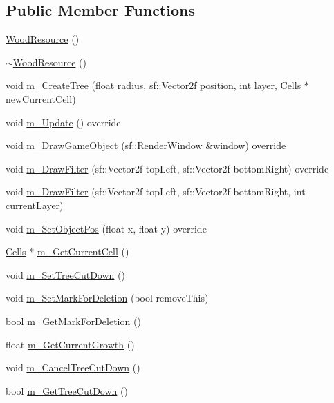 \subsection*{Public Member Functions}
\begin{DoxyCompactItemize}
\item 
\mbox{\hyperlink{class_wood_resource_a692782e93b0450b26694eb3d48c86a2a}{Wood\+Resource}} ()
\item 
\mbox{\hyperlink{class_wood_resource_ad525b51c0f4728951969b90498760a63}{$\sim$\+Wood\+Resource}} ()
\item 
void \mbox{\hyperlink{class_wood_resource_aeea45c6a211c4662ff114cd77f604c68}{m\+\_\+\+Create\+Tree}} (float radius, sf\+::\+Vector2f position, int layer, \mbox{\hyperlink{class_cells}{Cells}} $\ast$new\+Current\+Cell)
\item 
void \mbox{\hyperlink{class_wood_resource_a8ba1b597aacbdd74be37d0ab18d95008}{m\+\_\+\+Update}} () override
\item 
void \mbox{\hyperlink{class_wood_resource_a8f2336619be4467ba0eba87ded7b7474}{m\+\_\+\+Draw\+Game\+Object}} (sf\+::\+Render\+Window \&window) override
\item 
void \mbox{\hyperlink{class_wood_resource_a08e9ac9417b6337b4fe8afcb97783acf}{m\+\_\+\+Draw\+Filter}} (sf\+::\+Vector2f top\+Left, sf\+::\+Vector2f bottom\+Right) override
\item 
void \mbox{\hyperlink{class_wood_resource_acdbde685c1d8f702b41d89763f7bb0c7}{m\+\_\+\+Draw\+Filter}} (sf\+::\+Vector2f top\+Left, sf\+::\+Vector2f bottom\+Right, int current\+Layer)
\item 
void \mbox{\hyperlink{class_wood_resource_afa9f748e3dea5f08c18dd831f04d9287}{m\+\_\+\+Set\+Object\+Pos}} (float x, float y) override
\item 
\mbox{\hyperlink{class_cells}{Cells}} $\ast$ \mbox{\hyperlink{class_wood_resource_a9c7446775e6e37e60a0bfce147d8151f}{m\+\_\+\+Get\+Current\+Cell}} ()
\item 
void \mbox{\hyperlink{class_wood_resource_a90aadace134336f71aed1c167983c711}{m\+\_\+\+Set\+Tree\+Cut\+Down}} ()
\item 
void \mbox{\hyperlink{class_wood_resource_a5006853189de66810cbbfb2500b559c0}{m\+\_\+\+Set\+Mark\+For\+Deletion}} (bool remove\+This)
\item 
bool \mbox{\hyperlink{class_wood_resource_ac63bf6a2a12aed793b4e1da4aae57c00}{m\+\_\+\+Get\+Mark\+For\+Deletion}} ()
\item 
float \mbox{\hyperlink{class_wood_resource_a185e4bc651ee95a51239d8842c9c3773}{m\+\_\+\+Get\+Current\+Growth}} ()
\item 
void \mbox{\hyperlink{class_wood_resource_ab0aabdbb9fc8c1ff574a8528b6cda537}{m\+\_\+\+Cancel\+Tree\+Cut\+Down}} ()
\item 
bool \mbox{\hyperlink{class_wood_resource_aa7228add3ddade14e54acc5647b79a14}{m\+\_\+\+Get\+Tree\+Cut\+Down}} ()
\end{DoxyCompactItemize}
